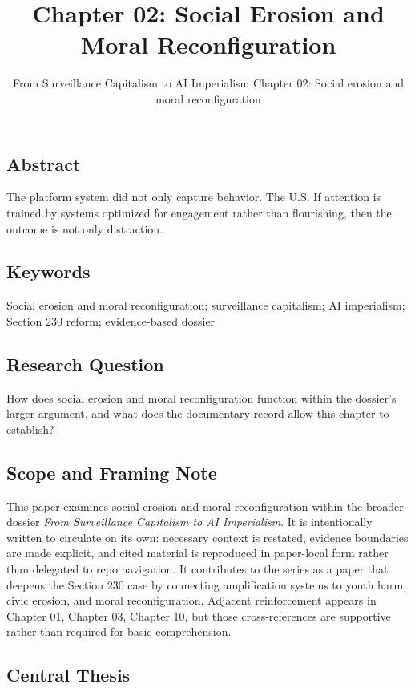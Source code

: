 \documentclass[
  american,
  11pt,
  letterpaper,
]{article}
\title{Chapter 02: Social Erosion and Moral Reconfiguration}
\subtitle{From Surveillance Capitalism to AI Imperialism \textbar{}
Chapter 02: Social erosion and moral reconfiguration}
\author{}
\date{}
\begin{document}
\maketitle

\subsection{Abstract}\label{abstract}

The platform system did not only capture behavior. The U.S. If attention
is trained by systems optimized for engagement rather than flourishing,
then the outcome is not only distraction.

\subsection{Keywords}\label{keywords}

Social erosion and moral reconfiguration; surveillance capitalism; AI
imperialism; Section 230 reform; evidence-based dossier

\subsection{Research Question}\label{research-question}

How does social erosion and moral reconfiguration function within the
dossier's larger argument, and what does the documentary record allow
this chapter to establish?

\subsection{Scope and Framing Note}\label{scope-and-framing-note}

This paper examines social erosion and moral reconfiguration within the
broader dossier \emph{From Surveillance Capitalism to AI Imperialism}.
It is intentionally written to circulate on its own: necessary context
is restated, evidence boundaries are made explicit, and cited material
is reproduced in paper-local form rather than delegated to repo
navigation. It contributes to the series as a paper that deepens the
Section 230 case by connecting amplification systems to youth harm,
civic erosion, and moral reconfiguration. Adjacent reinforcement appears
in Chapter 01, Chapter 03, Chapter 10, but those cross-references are
supportive rather than required for basic comprehension.

\subsection{Central Thesis}\label{central-thesis}
\end{document}
